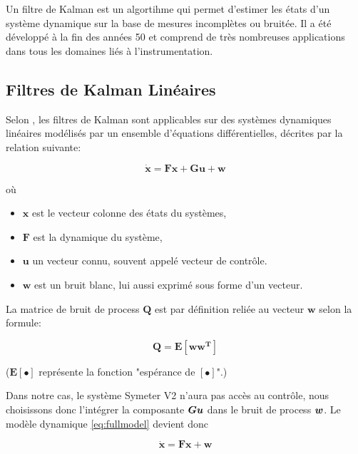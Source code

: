 \documentclass[12pt,a4paper]{report}
\begin{document}
	\para Un filtre de Kalman est un algortihme qui permet d'estimer les états d'un système dynamique sur la base  de mesures incomplètes ou bruitée. Il a été développé à la fin des années 50 et comprend de très nombreuses applications dans tous les domaines liés à l'instrumentation.
	
	\subsection{Filtres de Kalman Linéaires}
	Selon \cite{zarchan_fundamentals_2009}, les filtres de Kalman sont applicables sur des systèmes dynamiques linéaires modélisés par un ensemble d'équations différentielles, décrites par la relation suivante:
	
	\begin{equation}
		\label{eq:fullmodel}
	\boldsymbol{
		\dot{x} = Fx + Gu + w
	}
	\end{equation}
	
	\para où

	\begin{itemize}
	\item $\boldsymbol{x}$ est le vecteur colonne des états du systèmes, 
	\item $\boldsymbol{F}$ est la dynamique du système, 
	\item $\boldsymbol{u}$  un vecteur connu, souvent appelé vecteur de contrôle.
	\item $\boldsymbol{w}$ est un bruit blanc, lui aussi exprimé sous forme d'un vecteur.
	\end{itemize}

	La matrice de bruit de process \(\boldsymbol{Q}\) est par définition reliée au vecteur \(\boldsymbol{w}\) selon la formule:

	\begin{equation}
		\boldsymbol{Q = E[ww^T]}
	\end{equation}

	($\boldsymbol{E[\bullet]}$ représente la fonction "espérance de \([\bullet]\)".)
	
	\para Dans notre cas, le système Symeter V2 n'aura pas accès au contrôle, nous choisissons donc l'intégrer la composante $\boldsymbol{Gu}$ dans le bruit de process $\boldsymbol{w}$. Le modèle dynamique \ref{eq:fullmodel} devient donc 
	
	\begin{equation}
		\label{eq:actualmodel}
			\boldsymbol{
			\dot{x} = Fx + w
		}
	\end{equation}
\end{document}
